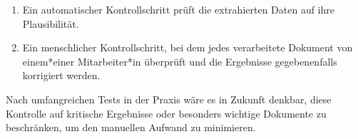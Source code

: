 \begin{enumerate}
	\item Ein automatischer Kontrollschritt prüft die extrahierten Daten auf ihre Plausibilität.
	
	\item Ein menschlicher Kontrollschritt, bei dem jedes verarbeitete Dokument von einem*einer Mitarbeiter*in überprüft und die Ergebnisse gegebenenfalls korrigiert werden.
\end{enumerate}

Nach umfangreichen Tests in der Praxis wäre es in Zukunft denkbar, diese Kontrolle auf kritische Ergebnisse oder besonders wichtige Dokumente zu beschränken, um den manuellen Aufwand zu minimieren.